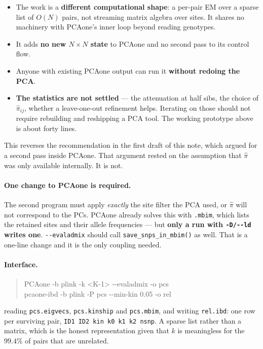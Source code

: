 \documentclass[10pt,a4paper]{article}
\newenvironment{tightitem}{%
  \begin{itemize}\setlength{\itemsep}{1pt}\setlength{\parskip}{0pt}%
  \setlength{\topsep}{3pt}\setlength{\parsep}{0pt}}{\end{itemize}}
\begin{document}
\begin{tightitem}
  \item The work is a \textbf{different computational shape}: a per-pair EM over a sparse list of $O(N)$
  pairs, not streaming matrix algebra over sites. It shares no machinery with PCAone's inner loop beyond
  reading genotypes.
  \item It adds \textbf{no new $N\times N$ state} to PCAone and no second pass to its control flow.
  \item Anyone with existing PCAone output can run it \textbf{without redoing the PCA}.
  \item \textbf{The statistics are not settled} --- the attenuation at half sibs, the choice of
  $\hat\pi_{ij}$, whether a leave-one-out refinement helps. Iterating on those should not require rebuilding
  and reshipping a PCA tool. The working prototype above is about forty lines.
\end{tightitem}

\noindent
This reverses the recommendation in the first draft of this note, which argued for a second pass inside
PCAone. That argument rested on the assumption that $\hat\pi$ was only available internally. It is not.

\paragraph{One change to PCAone is required.} The second program must apply \emph{exactly} the site filter
the PCA used, or $\hat\pi$ will not correspond to the PCs. PCAone already solves this with \texttt{.mbim},
which lists the retained sites and their allele frequencies --- but \textbf{only a run with \texttt{-D/-{}-ld}
writes one}. \texttt{-{}-evaladmix} should call \texttt{save\_snps\_in\_mbim()} as well. That is a one-line
change and it is the only coupling needed.

\paragraph{Interface.}
\begin{quote}\ttfamily\small
PCAone -b plink -k <K-1> -{}-evaladmix -o pcs\\
pcaone-ibd -b plink -P pcs -{}-min-kin 0.05 -o rel
\end{quote}
reading \texttt{pcs.eigvecs}, \texttt{pcs.kinship} and \texttt{pcs.mbim}, and writing \texttt{rel.ibd}: one
row per surviving pair, \texttt{ID1 ID2 kin k0 k1 k2 nsnp}. A sparse list rather than a matrix, which is the
honest representation given that $k$ is meaningless for the $99.4\%$ of pairs that are unrelated.
\end{document}
